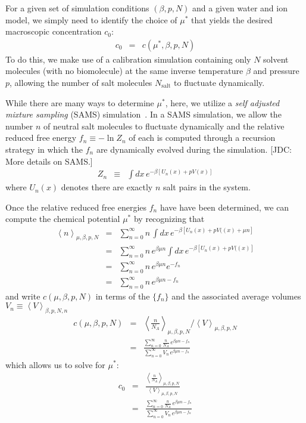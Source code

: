 \documentclass[aps,pre,twocolumn,nofootinbib,superscriptaddress,linenumbers,11point]{revtex4-1}
\begin{document}
For a given set of simulation conditions $(\beta, p, N)$ and a given water and ion model, we simply need to identify the choice of $\mu^*$ that yields the desired macroscopic concentration $c_0$:
\begin{eqnarray}
c_0 &=& c(\mu^*, \beta, p, N)
\end{eqnarray}
To do this, we make use of a calibration simulation containing only $N$ solvent molecules (with no biomolecule) at the same inverse temperature $\beta$ and pressure $p$, allowing the number of salt molecules $N_\mathrm{salt}$ to fluctuate dynamically.

While there are many ways to determine $\mu^*$, here, we utilize a \emph{self adjusted mixture sampling} (SAMS) simulation~\cite{sams}.
In a SAMS simulation, we allow the number $n$ of neutral salt molecules to fluctuate dynamically and the relative reduced free energy $f_n \equiv - \ln Z_n$ of each is computed through a recursion strategy in which the $f_n$ are dynamically evolved during the simulation.
{\color{red}[JDC: More details on SAMS.]}
\begin{eqnarray}
Z_n &\equiv& \int dx \, e^{-\beta [U_n(x) + p V(x)]}
\end{eqnarray}
where $U_n(x)$ denotes there are exactly $n$ salt pairs in the system.

Once the relative reduced free energies $f_n$ have have been determined, we can compute the chemical potential $\mu^*$ by recognizing that
\begin{eqnarray}
\left< n \right>_{\mu, \beta, p, N} &=& \sum_{n = 0}^\infty n \, \int dx \, e^{-\beta [ U_n(x) + p V((x) + \mu n ]} \\
&=&  \sum_{n = 0}^\infty n \, e^{\beta \mu n} \int dx \, e^{-\beta [ U_n(x) + p V((x) ]} \\
&=&  \sum_{n = 0}^\infty n \, e^{\beta \mu n} e^{-f_n} \\
&=&  \sum_{n = 0}^\infty n \, e^{\beta \mu n -f_n}
\end{eqnarray}
and write $c(\mu, \beta, p, N)$ in terms of the $\{f_n\}$ and the associated average volumes $V_n \equiv \left< V \right>_{\beta, p, N, n}$
\begin{eqnarray}
c(\mu, \beta, p, N) &=& \left< \frac{n}{N_A} \right>_{\mu, \beta, p, N} / \left< V \right>_{\mu, \beta, p, N} \\
&=& \frac{\sum_{n = 0}^\infty \frac{n}{N_A} \, e^{\beta \mu n -f_n}}{\sum_{n = 0}^\infty V_n \, e^{\beta \mu n -f_n}}
\end{eqnarray}
which allows us to solve for $\mu^*$:
\begin{eqnarray}
c_0 &=& \frac{\left< \frac{n}{N_A} \right>_{\mu, \beta, p, N}}{\left< V \right>_{\mu, \beta, p, N}} \\
&=& \frac{\sum_{n = 0}^\infty \frac{n}{N_A} \, e^{\beta \mu n -f_n}}{\sum_{n = 0}^\infty V_n \, e^{\beta \mu n -f_n}}
\end{eqnarray}
\end{document}
